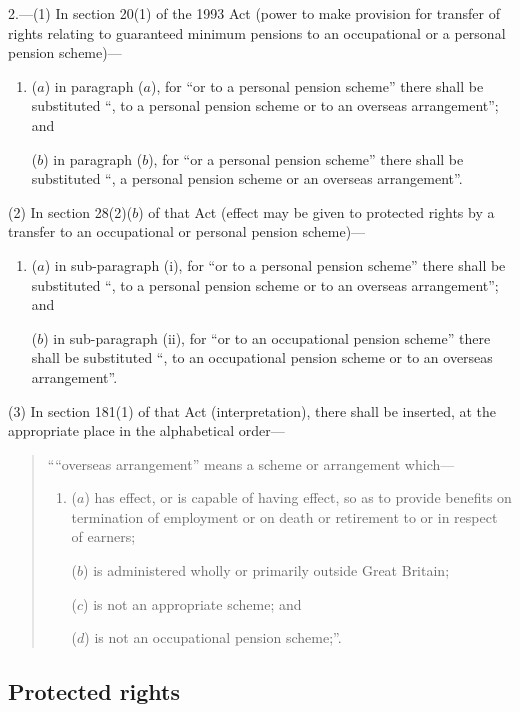 \documentclass[12pt,a4paper]{article}
\begin{document}
2.---(1) In section 20(1)  of the 1993 Act (power to make provision for transfer of rights relating to guaranteed minimum pensions to an occupational or a personal pension scheme)—
\begin{enumerate}\item[]
($a$) in paragraph ($a$), for “or to a personal pension scheme” there shall be substituted “, to a personal pension scheme or to an overseas arrangement”; and

($b$) in paragraph ($b$), for “or a personal pension scheme” there shall be substituted “, a personal pension scheme or an overseas arrangement”.
\end{enumerate}

(2) In section 28(2)($b$)  of that Act (effect may be given to protected rights by a transfer to an occupational or personal pension scheme)—
\begin{enumerate}\item[]
($a$) in sub-paragraph (i), for “or to a personal pension scheme” there shall be substituted “, to a personal pension scheme or to an overseas arrangement”; and

($b$) in sub-paragraph (ii), for “or to an occupational pension scheme” there shall be substituted “, to an occupational pension scheme or to an overseas arrangement”.
\end{enumerate}

(3) In section 181(1)  of that Act (interpretation), there shall be inserted, at the appropriate place in the alphabetical order—
\begin{quotation}
““overseas arrangement” means a scheme or arrangement which—
\begin{enumerate}\item[]
($a$) has effect, or is capable of having effect, so as to provide benefits on termination of employment or on death or retirement to or in respect of earners;

($b$) is administered wholly or primarily outside Great Britain;

($c$) is not an appropriate scheme; and

($d$) is not an occupational pension scheme;”.
\end{enumerate}
\end{quotation}

\subsection*{Protected rights}
\end{document}
